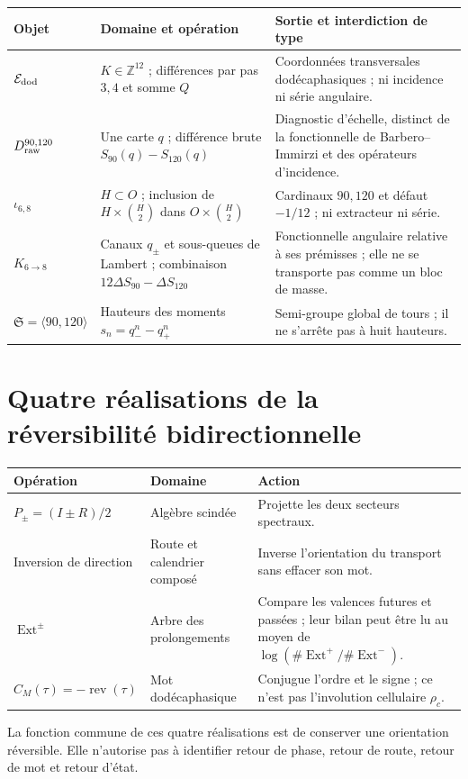 \begin{longtable}{@{}
>{\raggedright\arraybackslash}p{}
>{\raggedright\arraybackslash}p{}
>{\raggedright\arraybackslash}p{}@{}}
\toprule
Objet & Domaine et opération & Sortie et interdiction de type \\ \midrule
\endhead
\(\mathcal E_{\rm dod}\)&\(K\in\mathbb Z^{12}\) ; différences par pas
\(3,4\) et somme \(Q\)&Coordonnées transversales dodécaphasiques ; ni incidence
ni série angulaire.\\
\(D_{\rm raw}^{90,120}\)&Une carte \(q\) ; différence brute
\(S_{90}(q)-S_{120}(q)\)&Diagnostic d'échelle, distinct de la fonctionnelle de
Barbero--Immirzi et des opérateurs d'incidence.\\
\(\iota_{6,8}\)&\(H\subset O\) ; inclusion de
\(H\times\binom{H}{2}\) dans \(O\times\binom{H}{2}\)&Cardinaux \(90,120\) et
défaut \(-1/12\) ; ni extracteur ni série.\\
\(K_{6\to8}\)&Canaux \(q_\pm\) et sous-queues de Lambert ; combinaison
\(12\Delta S_{90}-\Delta S_{120}\)&Fonctionnelle angulaire relative à ses
prémisses ; elle ne se transporte pas comme un bloc de masse.\\
\(\mathfrak S=\langle90,120\rangle\)&Hauteurs des moments
\(s_n=q_-^n-q_+^n\)&Semi-groupe global de tours ; il ne s'arrête pas à huit hauteurs.\\
\bottomrule
\end{longtable}

\section*{Quatre réalisations de la réversibilité bidirectionnelle}

\begin{longtable}{@{}
  >{\raggedright\arraybackslash}p{}
  >{\raggedright\arraybackslash}p{}
  >{\raggedright\arraybackslash}p{}@{}}
\toprule
Opération & Domaine & Action \\ \midrule
\endhead
\(P_\pm=(I\pm R)/2\)&Algèbre scindée&Projette les deux secteurs
spectraux.\\
Inversion de direction&Route et calendrier composé&Inverse l'orientation du
transport sans effacer son mot.\\
\(\operatorname{Ext}^{\pm}\)&Arbre des prolongements&Compare les valences
futures et passées ; leur bilan peut être lu au moyen de
\(\log(\#\operatorname{Ext}^+/\#\operatorname{Ext}^-)\).\\
\(C_M(\tau)=-\operatorname{rev}(\tau)\)&Mot dodécaphasique&Conjugue l'ordre
et le signe ; ce n'est pas l'involution cellulaire \(\rho_c\).\\
\bottomrule
\end{longtable}

La fonction commune de ces quatre réalisations est de conserver une orientation
réversible. Elle n'autorise pas à identifier retour de phase, retour de route,
retour de mot et retour d'état.
